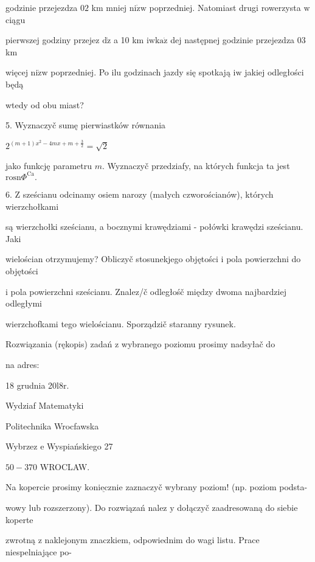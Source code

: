 \documentclass[a4paper,12pt]{article}
\begin{document}
godzinie przejezdza $02$ km mniej $\mathrm{n}\mathrm{i}\dot{\mathrm{z}}\mathrm{w}$ poprzedniej. Natomiast drugi rowerzysta $\mathrm{w}$ ciągu

pierwszej godziny przejez $\mathrm{d}\dot{\mathrm{z}}$ a 10 km $\mathrm{i}\mathrm{w}\mathrm{k}\mathrm{a}\dot{\mathrm{z}}$ dej następnej godzinie przejezdza $03$ km

więcej $\mathrm{n}\mathrm{i}\dot{\mathrm{z}}\mathrm{w}$ poprzedniej. Po ilu godzinach jazdy się spotkają $\mathrm{i}\mathrm{w}$ jakiej odległości będą

wtedy od obu miast?

5. Wyznaczyč sumę pierwiastków równania

$2^{(m+1)x^{2}-4mx+m+\frac{3}{2}}=\sqrt{2}$

jako funkcję parametru $m$. Wyznaczyč przedziafy, na których funkcja ta jest $\mathrm{r}\mathrm{o}\mathrm{s}\mathrm{n}\Phi^{\mathrm{C}\mathrm{a}}.$

6. $\mathrm{Z}$ sześcianu odcinamy osiem narozy (małych czworościanów), których wierzchołkami

są wierzchołki sześcianu, a bocznymi krawędziami - połówki krawędzi sześcianu. Jaki

wielościan otrzymujemy? Obliczyč stosunekjego objętości $\mathrm{i}$ pola powierzchni do objętości

$\mathrm{i}$ pola powierzchni sześcianu. Znalez/č odległośč między dwoma najbardziej odległymi

wierzchofkami tego wielościanu. Sporządzič staranny rysunek.

Rozwiązania (rękopis) zadań z wybranego poziomu prosimy nadsyłač do

na adres:

18 grudnia 20l8r.

Wydziaf Matematyki

Politechnika Wrocfawska

Wybrzez $\mathrm{e}$ Wyspiańskiego 27

$50-370$ WROCLAW.

Na kopercie prosimy $\underline{\mathrm{k}\mathrm{o}\mathrm{n}\mathrm{i}\mathrm{e}\mathrm{c}\mathrm{z}\mathrm{n}\mathrm{i}\mathrm{e}}$ zaznaczyč wybrany poziom! (np. poziom podsta-

wowy lub rozszerzony). Do rozwiązań nalez $\mathrm{y}$ dołączyč zaadresowaną do siebie koperte

zwrotną $\mathrm{z}$ naklejonym znaczkiem, odpowiednim do wagi listu. Prace niespelniające po-
\end{document}
